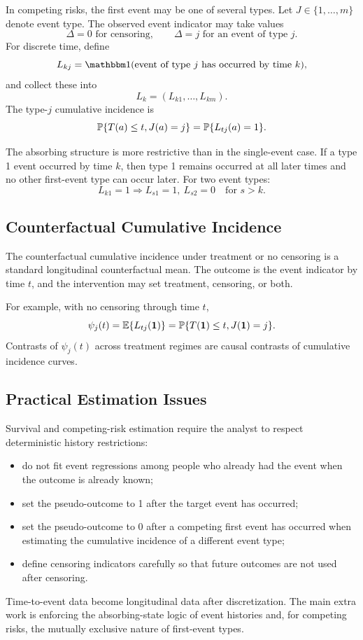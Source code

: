 In competing risks, the first event may be one of several types. Let
$J\in\{1,\ldots,m\}$ denote event type. The observed event indicator may take
values
\[
  \Delta=0 \text{ for censoring},\qquad
  \Delta=j \text{ for an event of type } j.
\]
For discrete time, define
\[
  L_{kj}=\ind(\text{event of type } j \text{ has occurred by time } k),
\]
and collect these into
\[
  L_k=(L_{k1},\ldots,L_{km}).
\]
The type-$j$ cumulative incidence is
\[
  \mathbb{P}\{T(a)\le t,J(a)=j\}=\mathbb{P}\{L_{tj}(a)=1\}.
\]

The absorbing structure is more restrictive than in the single-event case. If a
type 1 event occurred by time $k$, then type 1 remains occurred at all later
times and no other first-event type can occur later. For two event types:
\[
  L_{k1}=1 \Rightarrow L_{s1}=1,\ L_{s2}=0
  \quad\text{for }s>k.
\]

\subsection{Counterfactual Cumulative Incidence}

The counterfactual cumulative incidence under treatment or no censoring is a
standard longitudinal counterfactual mean. The outcome is the event indicator by
time $t$, and the intervention may set treatment, censoring, or both.

For example, with no censoring through time $t$,
\[
  \psi_j(t)=\mathbb{E}\{L_{tj}(\mathbf{1})\}
  =
  \mathbb{P}\{T(\mathbf{1})\le t,J(\mathbf{1})=j\}.
\]
Contrasts of $\psi_j(t)$ across treatment regimes are causal contrasts of
cumulative incidence curves.

\subsection{Practical Estimation Issues}

Survival and competing-risk estimation require the analyst to respect deterministic
history restrictions:
\begin{itemize}
  \item do not fit event regressions among people who already had the event when
  the outcome is already known;
  \item set the pseudo-outcome to 1 after the target event has occurred;
  \item set the pseudo-outcome to 0 after a competing first event has occurred
  when estimating the cumulative incidence of a different event type;
  \item define censoring indicators carefully so that future outcomes are not
  used after censoring.
\end{itemize}

\begin{keyidea}
Time-to-event data become longitudinal data after discretization. The main extra
work is enforcing the absorbing-state logic of event histories and, for competing
risks, the mutually exclusive nature of first-event types.
\end{keyidea}
